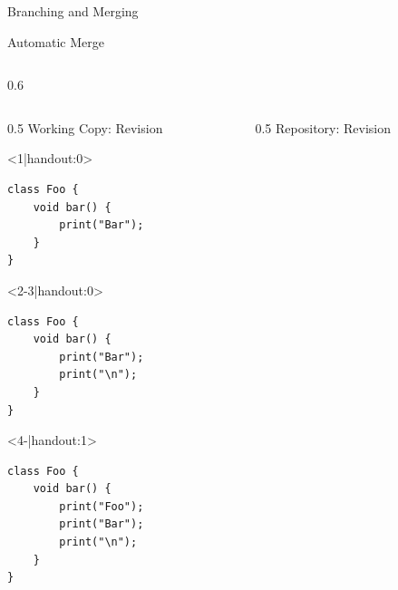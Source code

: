
\slideMergePull{}

\slideIgnore{}

\begin{frame}{Branching and Merging} %
	\slideBranchingAndMerging{}
\end{frame}

\begin{frame}[fragile]{Automatic Merge} %
	\begin{columns}[onlytextwidth]
		\begin{column}{0.6\linewidth}
			\begin{columns}[T]
				\begin{column}{0.5\linewidth}
					Working Copy: Revision \only<4>{\emph{11$^*$}}\\[2mm]

					\begin{onlyenv}<1|handout:0>
						\begin{lstlisting}[style=java,basicstyle=\fontfamily{pcr}\small\selectfont,numbers=none,escapechar=|]
class Foo {
	void bar() {
		print("Bar");
	}
}	
						\end{lstlisting}
					\end{onlyenv}
					\begin{onlyenv}
						\begin{lstlisting}[style=java,basicstyle=\fontfamily{pcr}\small\selectfont,numbers=none,escapechar=|]
class Foo {
	void bar() {
		print("Bar");
		print("\n");
	}
}	
						\end{lstlisting}
					\end{onlyenv}
					\begin{onlyenv}
						\begin{lstlisting}[style=java,basicstyle=\fontfamily{pcr}\small\selectfont,numbers=none,escapechar=|]
class Foo {
	void bar() {
		print("Foo");
		print("Bar");
		print("\n");
	}
}	
						\end{lstlisting}
					\end{onlyenv}
				\end{column}
				\begin{column}{0.5\linewidth}
					Repository: Revision \only<3->{\emph{11}}


\end{column}
\end{columns}
\end{column}
\end{columns}
\end{frame}
